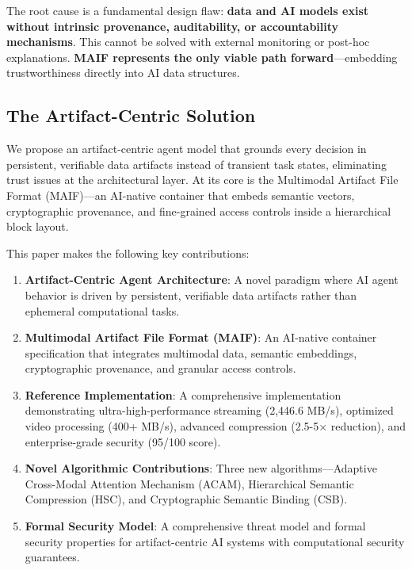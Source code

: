 \documentclass[conference]{IEEEtran}
\begin{document}
The root cause is a fundamental design flaw: \textbf{data and AI models exist without intrinsic provenance, auditability, or accountability mechanisms}. This cannot be solved with external monitoring or post-hoc explanations. \textbf{MAIF represents the only viable path forward}—embedding trustworthiness directly into AI data structures.

\subsection{The Artifact-Centric Solution}

We propose an artifact-centric agent model that grounds every decision in persistent, verifiable data artifacts instead of transient task states, eliminating trust issues at the architectural layer. At its core is the Multimodal Artifact File Format (MAIF)—an AI-native container that embeds semantic vectors, cryptographic provenance, and fine-grained access controls inside a hierarchical block layout.

This paper makes the following key contributions:

\begin{enumerate}[leftmargin=*]
\item \textbf{Artifact-Centric Agent Architecture}: A novel paradigm where AI agent behavior is driven by persistent, verifiable data artifacts rather than ephemeral computational tasks.

\item \textbf{Multimodal Artifact File Format (MAIF)}: An AI-native container specification that integrates multimodal data, semantic embeddings, cryptographic provenance, and granular access controls.

\item \textbf{Reference Implementation}: A comprehensive implementation demonstrating ultra-high-performance streaming (2,446.6 MB/s), optimized video processing (400+ MB/s), advanced compression (2.5-5× reduction), and enterprise-grade security (95/100 score).

\item \textbf{Novel Algorithmic Contributions}: Three new algorithms—Adaptive Cross-Modal Attention Mechanism (ACAM), Hierarchical Semantic Compression (HSC), and Cryptographic Semantic Binding (CSB).

\item \textbf{Formal Security Model}: A comprehensive threat model and formal security properties for artifact-centric AI systems with computational security guarantees.
\end{enumerate}
\end{document}

